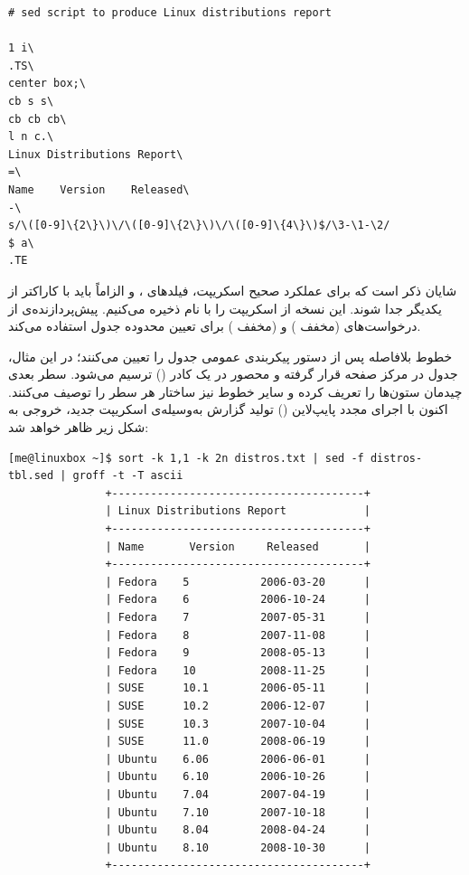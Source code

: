 \begin{latin}
\begin{lstlisting}
# sed script to produce Linux distributions report

1 i\
.TS\
center box;\
cb s s\
cb cb cb\
l n c.\
Linux Distributions Report\
=\
Name    Version    Released\
-\
s/\([0-9]\{2\}\)\/\([0-9]\{2\}\)\/\([0-9]\{4\}\)$/\3-\1-\2/
$ a\
.TE
\end{lstlisting}
\end{latin}

شایان ذکر است که برای عملکرد صحیح اسکریپت، فیلدهای ،  و  الزاماً باید با کاراکتر  از یکدیگر جدا شوند. این نسخه از اسکریپت را با نام  ذخیره می‌کنیم. پیش‌پردازنده‌ی  از درخواست‌های  (مخفف ) و  (مخفف ) برای تعیین محدوده جدول استفاده می‌کند.

خطوط بلافاصله پس از دستور  پیکربندی عمومی جدول را تعیین می‌کنند؛ در این مثال، جدول در مرکز صفحه قرار گرفته و محصور در یک کادر () ترسیم می‌شود. سطر بعدی چیدمان ستون‌ها را تعریف کرده و سایر خطوط نیز ساختار هر سطر را توصیف می‌کنند. اکنون با اجرای مجدد پایپ‌لاین () تولید گزارش به‌وسیله‌ی اسکریپت جدید، خروجی به شکل زیر ظاهر خواهد شد:

\begin{latin}
\begin{lstlisting}
[me@linuxbox ~]$ sort -k 1,1 -k 2n distros.txt | sed -f distros-tbl.sed | groff -t -T ascii
               +---------------------------------------+
               | Linux Distributions Report            |
               +---------------------------------------+
               | Name       Version     Released       |
               +---------------------------------------+
               | Fedora    5           2006-03-20      |
               | Fedora    6           2006-10-24      |
               | Fedora    7           2007-05-31      |
               | Fedora    8           2007-11-08      |
               | Fedora    9           2008-05-13      |
               | Fedora    10          2008-11-25      |
               | SUSE      10.1        2006-05-11      |
               | SUSE      10.2        2006-12-07      |
               | SUSE      10.3        2007-10-04      |
               | SUSE      11.0        2008-06-19      |
               | Ubuntu    6.06        2006-06-01      |
               | Ubuntu    6.10        2006-10-26      |
               | Ubuntu    7.04        2007-04-19      |
               | Ubuntu    7.10        2007-10-18      |
               | Ubuntu    8.04        2008-04-24      |
               | Ubuntu    8.10        2008-10-30      |
               +---------------------------------------+
\end{lstlisting}
\end{latin}

